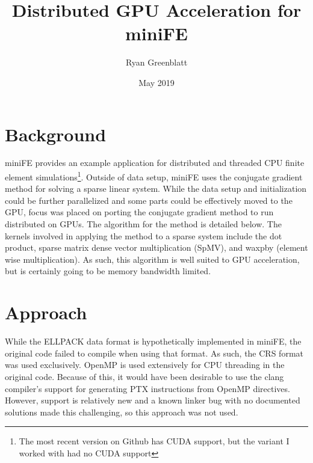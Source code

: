\documentclass{article}
\title{Distributed GPU Acceleration for miniFE}
\author{Ryan Greenblatt}
\date{May 2019}
\begin{document}
\setlength\parindent{0pt}

\renewcommand{\thesubsection}{\alph{subsection}}

\maketitle

\section{Background}

miniFE provides an example application for distributed and threaded CPU finite
element simulations\footnote{The most recent version on Github has CUDA
support, but the variant I worked with had no CUDA support}. Outside of data
setup, miniFE uses the conjugate gradient method for solving a sparse linear
system. While the data setup and initialization could be further parallelized
and some parts could be effectively moved to the GPU, focus was placed on
porting the conjugate gradient method to run distributed on GPUs. The algorithm
for the method is detailed below. The kernels involved in applying the method
to a sparse system include the dot product, sparse matrix dense vector
multiplication (SpMV), and waxpby (element wise multiplication). As such, this
algorithm is well suited to GPU acceleration, but is certainly going to
be memory bandwidth limited.

\begin{algorithm}
  \begin{algorithmic}[1]
    \State $r_0 \gets b - A x$
    \State $r_1 \gets r_0$
    \State $p \gets r_0$
    \State $i \gets 1$
  $}
    \State $p \gets r_i + \frac{\Vert r_i \Vert_2^2}{\Vert r_{i-1} \Vert_2^2} p$
    \State $\alpha \gets \frac{\Vert r_i \Vert_2^2}{\langle A p,  p\rangle}$
    \State $x \gets x + \alpha p$
    \State $r_{i+1} \gets r_i + \alpha A p$
    \State $i \gets i + 1$
    \EndWhile
    \EndProcedure
  \end{algorithmic}
\end{algorithm}

\section{Approach}

While the ELLPACK data format is hypothetically implemented in miniFE, the
original code failed to compile when using that format. As such, the CRS format
was used exclusively. OpenMP is used extensively for CPU threading in the
original code. Because of this, it would have been desirable to use the clang
compiler's support for generating PTX instructions from OpenMP directives.
However, support is relatively new and a known linker bug with no documented
solutions made this challenging, so this approach was not used.  \\
\end{document}
